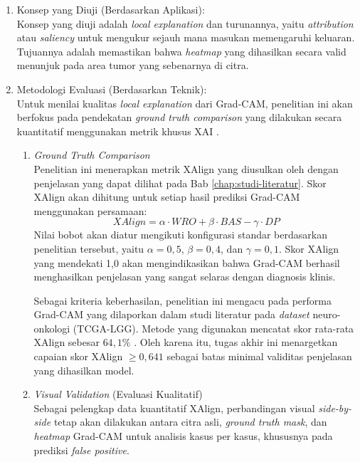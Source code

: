 \begin{enumerate}
	\item Konsep yang Diuji (Berdasarkan Aplikasi):\\
	Konsep yang diuji adalah \textit{local explanation} dan turunannya, yaitu \textit{attribution} atau \textit{saliency} untuk mengukur sejauh mana masukan memengaruhi keluaran. Tujuannya adalah memastikan bahwa \textit{heatmap} yang dihasilkan secara valid menunjuk pada area tumor yang sebenarnya di citra.
	
	\item Metodologi Evaluasi (Berdasarkan Teknik):\\
	Untuk menilai kualitas \textit{local explanation} dari Grad-CAM, penelitian ini akan berfokus pada pendekatan \textit{ground truth comparison} yang dilakukan secara kuantitatif menggunakan metrik khusus XAI \autocite{kadir2023evaluation}.
	
	\begin{enumerate}
		\item \textit{Ground Truth Comparison}\\
		Penelitian ini menerapkan metrik XAlign yang diusulkan oleh \textcite{muhammad2025heatmap} dengan penjelasan yang dapat dilihat pada Bab \ref{chap:studi-literatur}. Skor XAlign akan dihitung untuk setiap hasil prediksi Grad-CAM menggunakan persamaan:
		\begin{equation}
			XAlign = \alpha \cdot WRO + \beta \cdot BAS - \gamma \cdot DP
		\end{equation}
		Nilai bobot akan diatur mengikuti konfigurasi standar berdasarkan penelitian tersebut, yaitu $\alpha=0,5$, $\beta=0,4$, dan $\gamma=0,1$. Skor XAlign yang mendekati 1,0 akan mengindikasikan bahwa Grad-CAM berhasil menghasilkan penjelasan yang sangat selaras dengan diagnosis klinis.
		
		Sebagai kriteria keberhasilan, penelitian ini mengacu pada performa Grad-CAM yang dilaporkan dalam studi literatur pada \textit{dataset} neuro-onkologi (TCGA-LGG). Metode yang digunakan mencatat skor rata-rata XAlign sebesar $64,1\%$ \autocite{muhammad2025heatmap}. Oleh karena itu, tugas akhir ini menargetkan capaian skor XAlign $\geq 0,641$ sebagai batas minimal validitas penjelasan yang dihasilkan model.
		
		\item \textit{Visual Validation} (Evaluasi Kualitatif)\\
		Sebagai pelengkap data kuantitatif XAlign, perbandingan visual \textit{side-by-side} tetap akan dilakukan antara citra asli, \textit{ground truth mask}, dan \textit{heatmap} Grad-CAM untuk analisis kasus per kasus, khususnya pada prediksi \textit{false positive}.
	\end{enumerate}
\end{enumerate}